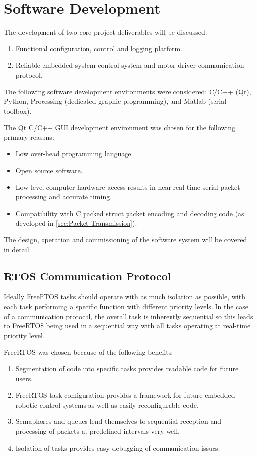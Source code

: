 \chapter{Software Development}
\label{chap:Software Development}

The development of two core project deliverables will be discussed:

\begin{enumerate}
\item Functional configuration, control and logging platform.
\item Reliable embedded system control system and motor driver communication protocol. 
\end{enumerate}

The following software development environments were considered: C/C++ (Qt), Python, Processing (dedicated graphic programming), and Matlab (serial toolbox). 

The Qt C/C++ GUI development environment was chosen for the following primary reasons:

\begin{itemize}
\item Low over-head programming language.
\item Open source software.
\item Low level computer hardware access results in near real-time serial packet processing and accurate timing.
\item Compatibility with C packed struct packet encoding and decoding code (as developed in \cref{sec:Packet Transmission}).
\end{itemize}

The design, operation and commissioning of the software system will be covered in detail. 

\section{RTOS Communication Protocol}

Ideally FreeRTOS tasks should operate with as much isolation as possible, with each task performing a specific function with different priority levels. In the case of a communication protocol, the overall task is inherently sequential so this leads to FreeRTOS being used in a sequential way with all tasks operating at real-time priority level. 

FreeRTOS was chosen because of the following benefits:

\begin{enumerate}
\item Segmentation of code into specific tasks provides readable code for future users.
\item FreeRTOS task configuration provides a framework for future embedded robotic control systems as well as easily reconfigurable code.
\item Semaphores and queues lend themselves to sequential reception and processing of packets at predefined intervals very well.
\item Isolation of tasks provides easy debugging of communication issues.
\end{enumerate}


